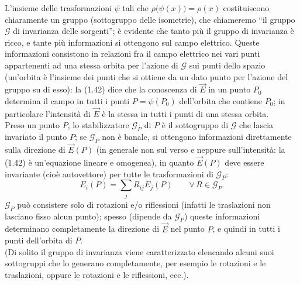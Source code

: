 L'insieme delle trasformazioni $\psi$ tali che $\rho\big(\psi(x)\big)=\rho(x)$
costituiscono chiaramente un gruppo (sottogruppo delle isometrie), che
chiameremo ``il gruppo $\mathcal G$ di invarianza delle sorgenti''; \`e evidente
che tanto pi\`u il gruppo di invarianza \`e ricco, e tante pi\`u informazioni si
ottengono sul campo elettrico. Queste informazioni consistono in relazioni fra
il campo elettrico nei vari punti appartenenti ad una stessa orbita per l'azione
di $\mathcal G$ sui punti dello spazio (un'orbita \`e l'insieme dei punti che si
ottiene da un dato punto per l'azione del gruppo su di esso): la (1.42) dice che
la conoscenza di $\vec E$ in un punto $P_0$ determina il campo in tutti i punti
$P=\psi(P_0)$ dell'orbita che contiene $P_0$; in particolare l'intensit\`a di
$\vec E$ \`e la stessa in tutti i punti di una stessa orbita.\\
Preso un punto $P$, lo stabilizzatore $\mathcal G_P$ di $P$ \`e il sottogruppo
di $\mathcal G$ che lascia invariato il punto $P$; se $\mathcal G_P$ non \`e
banale, si ottengono informazioni direttamente sulla direzione di $\vec E(P)$
(in generale non sul verso e neppure sull'intensit\`a: la (1.42) \`e
un'equazione lineare e omogenea), in quanto $\vec E(P)$ deve essere invariante
(cio\`e autovettore) per tutte le trasformazioni di $\mathcal G_P$:
\begin{equation}
  E_i(P)=\textstyle\sum_jR_{ij}E_j(P)\qquad\forall\,R\in\mathcal G_P.
  \tag{1.43}
\end{equation}
$\mathcal G_P$ pu\`o consistere solo di rotazioni e/o riflessioni (infatti le
traslazioni non lasciano fisso alcun punto); spesso (dipende da $\mathcal G_P$)
queste informazioni determinano completamente la direzione di $\vec E$ nel punto
$P$, e quindi in tutti i punti dell'orbita di $P$.\\
(Di solito il gruppo di invarianza viene caratterizzato elencando alcuni suoi
sottogruppi che lo generano completamente, per esempio le rotazioni e le
traslazioni, oppure le rotazioni e le riflessioni, ecc.).

